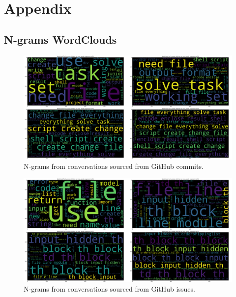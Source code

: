 \chapter{Appendix}\label{appendix}

\section{N-grams WordClouds}\label{appendix:ngrams}

\begin{figure}[H]
    \centering
    \includegraphics[width=\textwidth]{imgs/commits-ngrams.png}
    \caption{N-grams from conversations sourced from GitHub commits.}
    \label{fig:commits-ngrams}
\end{figure}

\begin{figure}[H]
    \centering
    \includegraphics[width=\textwidth]{imgs/issues-ngrams.png}
    \caption{N-grams from conversations sourced from GitHub issues.}
    \label{fig:issues-ngrams}
\end{figure}


